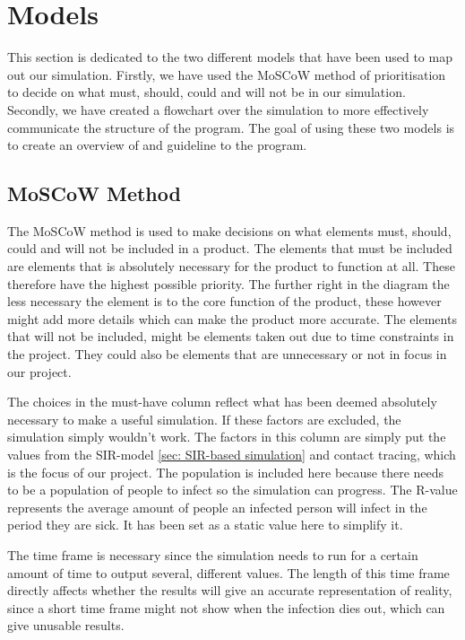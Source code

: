 \section{Models}

This section is dedicated to the two different models that have been used to map out our simulation. Firstly, we have used the MoSCoW method of prioritisation to decide on what must, should, could and will not be in our simulation. Secondly, we have created a flowchart over the simulation to more effectively communicate the structure of the program. The goal of using these two models is to create an overview of and guideline to the program.

\subsection{MoSCoW Method}

The MoSCoW method is used to make decisions on what elements must, should, could and will not be included in a product. The elements that must be included are elements that is absolutely necessary for the product to function at all. These therefore have the highest possible priority. The further right in the diagram the less necessary the element is to the core function of the product, these however might add more details which can make the product more accurate. The elements that will not be included, might be elements taken out due to time constraints in the project. They could also be elements that are unnecessary or not in focus in our project.



The choices in the must-have column reflect what has been deemed absolutely necessary to make a useful simulation. If these factors are excluded, the simulation simply wouldn't work. The factors in this column are simply put the values from the SIR-model \ref{sec: SIR-based simulation} and contact tracing, which is the focus of our project. The population is included here because there needs to be a population of people to infect so the simulation can progress. The R-value represents the average amount of people an infected person will infect in the period they are sick. It has been set as a static value here to simplify it.

The time frame is necessary since the simulation needs to run for a certain amount of time to output several, different values. The length of this time frame directly affects whether the results will give an accurate representation of reality, since a short time frame might not show when the infection dies out, which can give unusable results. 

